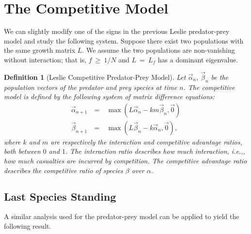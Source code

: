 \documentclass[11pt,reqno]{amsart}
\numberwithin{equation}{section}
\theoremstyle{plain}
\newtheorem{definition}[thm]{Definition}
\begin{document}
\section{The Competitive Model}
We can slightly modify one of the signs in the previous Leslie predator-prey model and 
study the following system. Suppose there exist two populations with the same growth matrix $L$. We assume the two populations are non-vanishing without interaction; that is, $f \ \geq \ 1/N$ and $L \ = \ L_f$ has a dominant eigenvalue. 

\begin{definition}[Leslie Competitive Predator-Prey  Model]
Let $\vec \alpha_n$, $\vec \beta_n$ be the population vectors 
of the predator and prey species at time $n$. The competitive model is defined by the following 
system of matrix difference equations:
\begin{eqnarray}\label{eqn:conditions}
    \vec \alpha_{n + 1} & \ = \ & \max(L \vec \alpha_n - k m \vec \beta_n, \vec 0) \\ 
    \vec \beta_{n + 1} & \ = \ & \max(L \vec \beta_n - k \vec \alpha_n, \vec 0) \nonumber,
\end{eqnarray}
where $k$ and $m$ are respectively the interaction and competitive advantage ratios, both between $0$ and $1$. The interaction ratio describes how much interaction, i.e.,, how much casualties are incurred by competition. The competitive advantage ratio describes the competitive ratio of species $\beta$ over $\alpha$. 
\end{definition}



\subsection{Last Species Standing}\label{sec:lastSpecies}

A similar analysis used for the predator-prey model 
can be applied to yield the following result.
\end{document}
